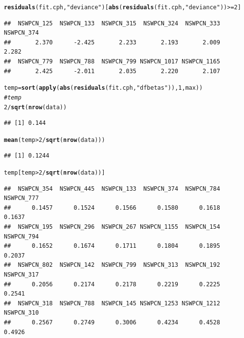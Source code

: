 \documentclass{article}\usepackage[]{graphicx}\usepackage[]{color}
\makeatletter
\newcommand{\hlnum}[1]{\textcolor[rgb]{0.686,0.059,0.569}{#1}}%
\newcommand{\hlstr}[1]{\textcolor[rgb]{0.192,0.494,0.8}{#1}}%
\newcommand{\hlcom}[1]{\textcolor[rgb]{0.678,0.584,0.686}{\textit{#1}}}%
\newcommand{\hlopt}[1]{\textcolor[rgb]{0,0,0}{#1}}%
\newcommand{\hlstd}[1]{\textcolor[rgb]{0.345,0.345,0.345}{#1}}%
\newcommand{\hlkwb}[1]{\textcolor[rgb]{0.69,0.353,0.396}{#1}}%
\newcommand{\hlkwd}[1]{\textcolor[rgb]{0.737,0.353,0.396}{\textbf{#1}}}%
\newenvironment{kframe}{%
 \def\at@end@of@kframe{}%
 \ifinner\ifhmode%
  \def\at@end@of@kframe{\end{minipage}}%
  \begin{minipage}{\columnwidth}%
 \fi\fi%
 \def\FrameCommand##1{\hskip\@totalleftmargin \hskip-\fboxsep
 \colorbox{shadecolor}{##1}\hskip-\fboxsep
     \hskip-\linewidth \hskip-\@totalleftmargin \hskip\columnwidth}%
 \MakeFramed {\advance\hsize-\width
   \@totalleftmargin\z@ \linewidth\hsize
   \@setminipage}}%
 {\par\unskip\endMakeFramed%
 \at@end@of@kframe}
\newenvironment{knitrout}{}{} %
\makeatother
\begin{document}
\begin{knitrout}
\begin{kframe}\begin{alltt}
\hlkwd{residuals}\hlstd{(fit.cph,} \hlstr{"deviance"}\hlstd{)[}\hlkwd{abs}\hlstd{(}\hlkwd{residuals}\hlstd{(fit.cph,} \hlstr{"deviance"}\hlstd{))} \hlopt{>=} \hlnum{2}\hlstd{]}
\end{alltt}
\begin{verbatim}
##  NSWPCN_125  NSWPCN_133  NSWPCN_315  NSWPCN_324  NSWPCN_333  NSWPCN_374 
##       2.370      -2.425       2.233       2.193       2.009       2.282 
##  NSWPCN_779  NSWPCN_788  NSWPCN_799 NSWPCN_1017 NSWPCN_1165 
##       2.425      -2.011       2.035       2.220       2.107
\end{verbatim}
\begin{alltt}
\hlstd{temp} \hlkwb{=} \hlkwd{sort}\hlstd{(}\hlkwd{apply}\hlstd{(}\hlkwd{abs}\hlstd{(}\hlkwd{residuals}\hlstd{(fit.cph,} \hlstr{"dfbetas"}\hlstd{)),} \hlnum{1}\hlstd{, max))}
\hlcom{#temp}
\hlnum{2}\hlopt{/}\hlkwd{sqrt}\hlstd{(}\hlkwd{nrow}\hlstd{(data))}
\end{alltt}
\begin{verbatim}
## [1] 0.144
\end{verbatim}
\begin{alltt}
\hlkwd{mean}\hlstd{(temp} \hlopt{>} \hlnum{2}\hlopt{/}\hlkwd{sqrt}\hlstd{(}\hlkwd{nrow}\hlstd{(data)))}
\end{alltt}
\begin{verbatim}
## [1] 0.1244
\end{verbatim}
\begin{alltt}
\hlstd{temp[temp} \hlopt{>} \hlnum{2}\hlopt{/}\hlkwd{sqrt}\hlstd{(}\hlkwd{nrow}\hlstd{(data))]}
\end{alltt}
\begin{verbatim}
##  NSWPCN_354  NSWPCN_445  NSWPCN_133  NSWPCN_374  NSWPCN_784  NSWPCN_777 
##      0.1457      0.1524      0.1566      0.1580      0.1618      0.1637 
##  NSWPCN_195  NSWPCN_296  NSWPCN_267 NSWPCN_1155  NSWPCN_154  NSWPCN_794 
##      0.1652      0.1674      0.1711      0.1804      0.1895      0.2037 
##  NSWPCN_802  NSWPCN_142  NSWPCN_799  NSWPCN_313  NSWPCN_192  NSWPCN_317 
##      0.2056      0.2174      0.2178      0.2219      0.2225      0.2541 
##  NSWPCN_318  NSWPCN_788  NSWPCN_145 NSWPCN_1253 NSWPCN_1212  NSWPCN_310 
##      0.2567      0.2749      0.3006      0.4234      0.4528      0.4926
\end{verbatim}
\end{kframe}
\end{knitrout}
\end{document}
